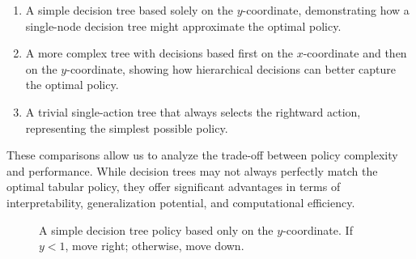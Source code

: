 \begin{enumerate}
    \item A simple decision tree based solely on the $y$-coordinate, demonstrating how a single-node decision tree might approximate the optimal policy.
    \item A more complex tree with decisions based first on the $x$-coordinate and then on the $y$-coordinate, showing how hierarchical decisions can better capture the optimal policy.
    \item A trivial single-action tree that always selects the rightward action, representing the simplest possible policy.
\end{enumerate}

These comparisons allow us to analyze the trade-off between policy complexity and performance. While decision trees may not always perfectly match the optimal tabular policy, they offer significant advantages in terms of interpretability, generalization potential, and computational efficiency.

\begin{figure}[ht]
\centering
{}
\caption{A simple decision tree policy based only on the $y$-coordinate. If $y < 1$, move right; otherwise, move down.}\label{fig:dt-simple}
\end{figure}


